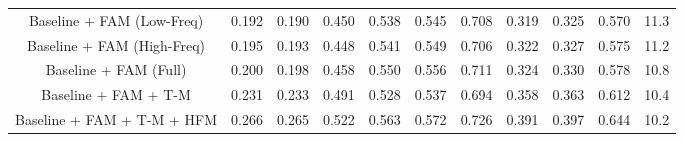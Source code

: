 \documentclass[journal]{IEEEtran}
\begin{document}
\begin{table}[]
\begin{tabular}{@{}c|ccc|ccc|ccc|c@{}}
Baseline + FAM (Low-Freq)         & 0.192                        & 0.190                         & 0.450                        & 0.538                        & 0.545                        & 0.708                        & 0.319                        & 0.325                        & 0.570                         & 11.3                           \\
Baseline + FAM (High-Freq)        & 0.195                        & 0.193                        & 0.448                        & 0.541                        & 0.549                        & 0.706                        & 0.322                        & 0.327                        & 0.575                        & 11.2                           \\
Baseline + FAM (Full)             & 0.200                          & 0.198                        & 0.458                        & 0.550                         & 0.556                        & 0.711                        & 0.324                        & 0.330                         & 0.578                        & 10.8                           \\
Baseline + FAM + T-M              & 0.231                        & 0.233                        & 0.491                        & 0.528                        & 0.537                        & 0.694                        & 0.358                        & 0.363                        & 0.612                        & 10.4                           \\
Baseline + FAM + T-M + HFM        & {\color[HTML]{FE0000} 0.266} & {\color[HTML]{FE0000} 0.265} & {\color[HTML]{FE0000} 0.522} & {\color[HTML]{FE0000} 0.563} & {\color[HTML]{FE0000} 0.572} & {\color[HTML]{FE0000} 0.726} & {\color[HTML]{FE0000} 0.391} & {\color[HTML]{FE0000} 0.397} & {\color[HTML]{FE0000} 0.644} & {\color[HTML]{FE0000} 10.2}    \\ \bottomrule
\end{tabular}
\label{abla}
\end{table}
\end{document}
